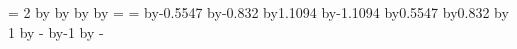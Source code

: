 {{		\pgf@x%
		\pgf@x%
		\pgf@xc= 2\pgf@x%
		\pgf@x%
		\centerpoint
		\advance\pgf@xb by\pgf@x
		\advance\pgf@yb by\pgf@y
		\advance\pgf@xc by\pgf@x
		\advance\pgf@yc by\pgf@y
		\pgf@xa=\pgf@x
		\pgf@ya=\pgf@y
		\advance\pgf@xa by-0.5547\pgfutil@tempdimb%
		\advance\pgf@ya by-0.832\pgfutil@tempdimb%
		\pgfpathmoveto{\pgfpoint{\pgf@xa}{\pgf@ya}}%
		\pgfpathlineto{\pgfpoint{\pgf@xb}{\pgf@yb}}%
		\pgfpathlineto{\pgfpoint{\pgf@xc}{\pgf@yc}}%
		\advance\pgf@xa by1.1094\pgfutil@tempdimb%
		\pgfpathlineto{\pgfpoint{\pgf@xa}{\pgf@ya}}%
		\advance\pgf@xa by-1.1094\pgfutil@tempdimb%
		\pgfpathmoveto{\pgfpoint{\pgf@xa}{\pgf@ya}}%
		\pgfpathclose%
		\advance\pgf@xa by0.5547\pgfutil@tempdimb%
		\advance\pgf@ya by0.832\pgfutil@tempdimb%
		\advance\pgf@xb by 1\pgfutil@tempdima
		\advance\pgf@yb by -\pgfutil@tempdimb
		\advance\pgf@xc by-1\pgfutil@tempdima
		\advance\pgf@yc by -\pgfutil@tempdimb
		\edef\pgf@marshal{%
			\noexpand\pgfpathcircle{%
				\noexpand\pgfqpoint{\the\pgf@xa}{\the\pgf@ya}}
			{\the\pgfutil@tempdimb}%
			\noexpand\pgfpathcircle{%
				\noexpand\pgfqpoint{\the\pgf@xb}{\the\pgf@yb}}
			{\the\pgfutil@tempdimb}%
			\noexpand\pgfpathcircle{%
				\noexpand\pgfqpoint{\the\pgf@xc}{\the\pgf@yc}}
			{\the\pgfutil@tempdimb}%
		}\pgf@marshal
	}%
}
